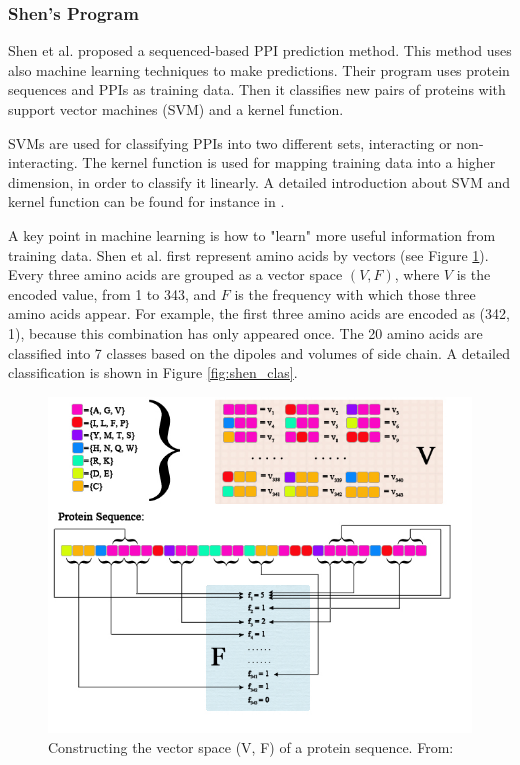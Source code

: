 \subsubsection{Shen's Program}
Shen et al. \cite{Shen07_PPIpred} proposed a sequenced-based PPI prediction method. This method uses also machine learning techniques to make predictions. Their program uses protein sequences and PPIs as training data. Then it classifies new pairs of proteins with support vector machines (SVM) and a kernel function.

SVMs are used for classifying PPIs into two different sets, interacting or non-interacting. The kernel function is used for mapping training data into a higher dimension, in order to classify it linearly. A detailed introduction about SVM and kernel function can be found for instance in \cite{trevor2001elements}.

A key point in machine learning is how to "learn" more useful information from training data. Shen et al. first represent amino acids by vectors (see Figure \ref{fig:shen}). Every three amino acids are grouped as a vector space $(V, F)$, where $V$ is the encoded value, from 1 to 343, and $F$ is the frequency with which those three amino acids appear. For example, the first three amino acids are encoded as (342, 1), because this combination has only appeared once. The 20 amino acids are classified into 7 classes based on the dipoles and volumes of side chain. A detailed classification is shown in Figure \ref{fig:shen_clas}.
\begin{figure}[h!]
\begin{center}
\includegraphics[height =13 cm, width = 13cm]{img/C_3_encode.jpg}
\caption{Constructing the vector space (V, F) of a protein sequence. From: \cite{Shen07_PPIpred} \label{fig:shen}}
\end{center}
\end{figure}

